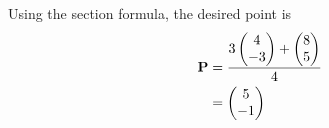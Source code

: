
Using  the section formula, 
the desired point is 
\begin{align}
	\mathbf{P} &= \frac{3 \begin{pmatrix}4\\-3\end{pmatrix} + \begin{pmatrix}8\\5\end{pmatrix}}{4}
	\\
&=\begin{pmatrix}5\\-1\end{pmatrix}
\end{align}
